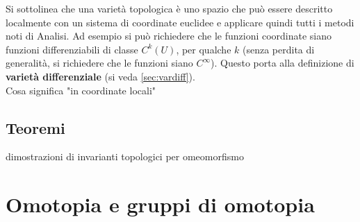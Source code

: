 Si sottolinea che una varietà topologica è uno spazio che può essere descritto
localmente con un sistema di coordinate euclidee e applicare quindi tutti i metodi
noti di Analisi.
Ad esempio si può richiedere che le funzioni coordinate siano funzioni differenziabili
di classe $C^{k}(U)$, per qualche $k$ (senza perdita di generalità, si richiedere che le funzioni siano $C^\infty$). Questo porta alla definizione di
\textbf{varietà differenziale} (si veda \ref{sec:vardiff}).\\

Cosa significa "in coordinate locali"

\subsection*{Teoremi}
dimostrazioni di invarianti topologici per omeomorfismo

\section{Omotopia e gruppi di omotopia}

